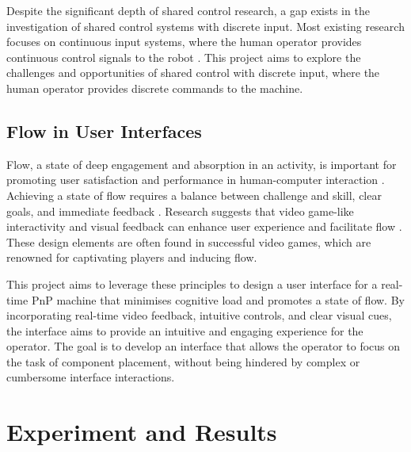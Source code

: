 \documentclass[12pt,british,UKenglish]{article}
\begin{document}
Despite the significant depth of shared control research, a gap exists in the investigation of shared control systems with discrete input.
Most existing research focuses on continuous input systems, where the human operator provides continuous control signals to the robot \cite{Dragan2013}.
This project aims to explore the challenges and opportunities of shared control with discrete input, where the human operator provides discrete commands to the machine.

\subsection{Flow in User Interfaces}
Flow, a state of deep engagement and absorption in an activity, is important for promoting user satisfaction and performance in human-computer interaction \cite{10.3389/fpsyg.2022.815665,csikszentmihalyi2000beyond}.
Achieving a state of flow requires a balance between challenge and skill, clear goals, and immediate feedback \cite{csikszentmihalyi2000beyond}.
Research suggests that video game-like interactivity and visual feedback can enhance user experience and facilitate flow \cite{doi:10.1177/1541931215591400}.
These design elements are often found in successful video games, which are renowned for captivating players and inducing flow.

This project aims to leverage these principles to design a user interface for a real-time \acl*{PnP} machine that minimises cognitive load and promotes a state of flow.
By incorporating real-time video feedback, intuitive controls, and clear visual cues, the interface aims to provide an intuitive and engaging experience for the operator.
The goal is to develop an interface that allows the operator to focus on the task of component placement, without being hindered by complex or cumbersome interface interactions.


\section{Experiment and Results}\label{sec:Experiment-Results}

\end{document}
